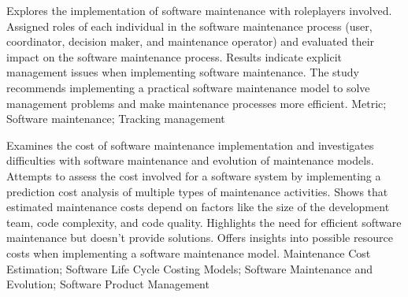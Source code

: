 
{
    Explores the implementation of software maintenance with roleplayers involved.
}
{
    Assigned roles of each individual in the software maintenance process (user, coordinator, decision maker, and maintenance operator) and evaluated their impact on the software maintenance process.
}
{
    Results indicate explicit management issues when implementing software maintenance.
}
{
    The study recommends implementing a practical software maintenance model to solve management problems and make maintenance processes more efficient.
}
{
    Metric; Software maintenance; Tracking management
}


{
    Examines the cost of software maintenance implementation and investigates difficulties with software maintenance and evolution of maintenance models.
}
{
    Attempts to assess the cost involved for a software system by implementing a prediction cost analysis of multiple types of maintenance activities.
}
{
    Shows that estimated maintenance costs depend on factors like the size of the development team, code complexity, and code quality.
}
{
    Highlights the need for efficient software maintenance but doesn't provide solutions. Offers insights into possible resource costs when implementing a software maintenance model.
}
{
    Maintenance Cost Estimation; Software Life Cycle Costing Models; Software Maintenance and Evolution; Software Product Management
}

